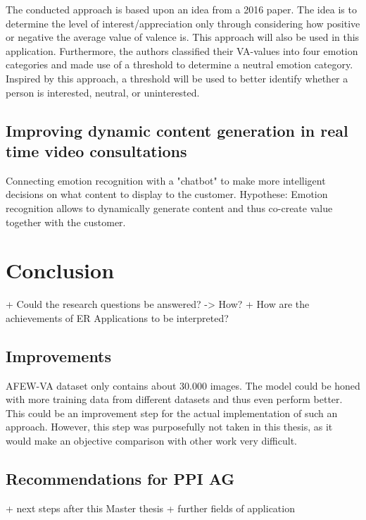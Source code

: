 \documentclass[11pt,a4paper]{scrbook}
\begin{document}
The conducted approach is based upon an idea from a 2016 paper.\cite{Kamaruddin:2016:MeasuringCustomerSatisfaction} The idea is to determine the level of interest/appreciation only through considering how positive or negative the average value of valence is. This approach will also be used in this application.
\newline\newline
Furthermore, the authors classified their VA-values into four emotion categories and made use of a threshold to determine a neutral emotion category. Inspired by this approach, a threshold will be used to better identify whether a person is interested, neutral, or uninterested.


\section{Improving dynamic content generation in real time video consultations}
Connecting emotion recognition with a "chatbot" to make more intelligent decisions on what content to display to the customer.
\newline\newline
Hypothese: Emotion recognition allows to dynamically generate content and thus co-create value together with the customer.


\chapter{Conclusion}
+ Could the research questions be answered? -> How?
+ How are the achievements of ER Applications to be interpreted?

\section{Improvements}
AFEW-VA dataset only contains about 30.000 images. The model could be honed with more training data from different datasets and thus even perform better. This could be an improvement step for the actual implementation of such an approach. However, this step was purposefully not taken in this thesis, as it would make an objective comparison with other work very difficult.

\section{Recommendations for PPI AG}
+ next steps after this Master thesis
+ further fields of application
\end{document}

